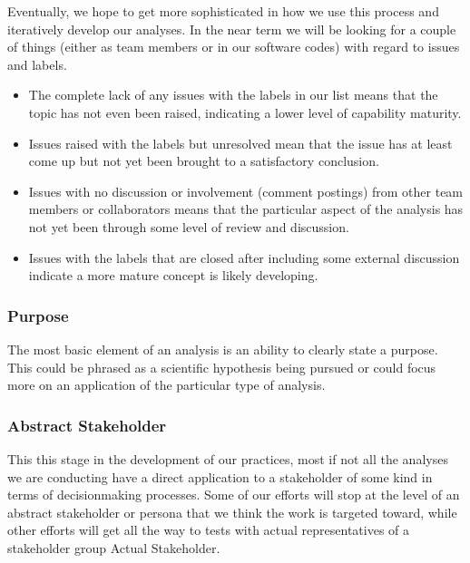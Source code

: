 \documentclass[letterpaper,10pt,english]{sphinxmanual}
\begin{document}
Eventually, we hope to get more sophisticated in how we use this process and iteratively develop our analyses. In the near term we will be looking for a couple of things (either as team members or in our software codes) with regard to issues and labels.
\begin{itemize}
\item {} 
The complete lack of any issues with the labels in our list means that the topic has not even been raised, indicating a lower level of capability maturity.

\item {} 
Issues raised with the labels but unresolved mean that the issue has at least come up but not yet been brought to a satisfactory conclusion.

\item {} 
Issues with no discussion or involvement (comment postings) from other team members or collaborators means that the particular aspect of the analysis has not yet been through some level of review and discussion.

\item {} 
Issues with the labels that are closed after including some external discussion indicate a more mature concept is likely developing.

\end{itemize}


\subsubsection{Purpose}
\label{\detokenize{baps:purpose}}
The most basic element of an analysis is an ability to clearly state a purpose. This could be phrased as a scientific hypothesis being pursued or could focus more on an application of the particular type of analysis.


\subsubsection{Abstract Stakeholder}
\label{\detokenize{baps:abstract-stakeholder}}
This this stage in the development of our practices, most if not all the analyses we are conducting have a direct application to a stakeholder of some kind in terms of decisionmaking processes. Some of our efforts will stop at the level of an abstract stakeholder or persona that we think the work is targeted toward, while other efforts will get all the way to tests with actual representatives of a stakeholder group Actual Stakeholder.
\end{document}
